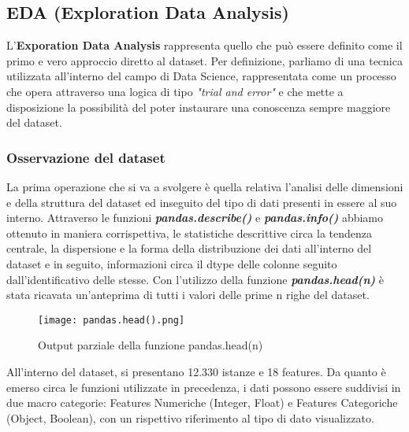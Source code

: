 \documentclass[10pt,a4paper]{article}
\begin{document}
\subsection{EDA (Exploration Data Analysis)}
L'\textbf{Exporation Data Analysis} rappresenta quello che può essere definito come il primo e vero approccio diretto al dataset.
Per definizione, parliamo di una tecnica utilizzata all'interno del campo di Data Science, rappresentata come un processo che opera attraverso una logica di tipo \emph{"trial and error"} e che mette a disposizione la possibilità del poter instaurare una conoscenza sempre maggiore del dataset.

\subsubsection{Osservazione del dataset}
La prima operazione che si va a svolgere è quella relativa l'analisi delle dimensioni e della struttura del dataset ed inseguito del tipo di dati presenti in essere al suo interno.
Attraverso le funzioni  \textbf{\emph{pandas.describe()}} e \textbf{\emph{pandas.info()}} abbiamo ottenuto in maniera corrispettiva, le statistiche descrittive circa la tendenza centrale, la dispersione e la forma della distribuzione dei dati all'interno del dataset e in seguito, informazioni circa il dtype delle colonne seguito dall'identificativo delle stesse.
Con l'utilizzo della funzione \textbf{\emph{pandas.head(n)}} è stata ricavata un'anteprima di tutti i valori delle prime n righe del dataset.

\begin{figure}[ht]
    \centering\texttt{[image: pandas.head().png]}
    \caption{Output parziale della funzione pandas.head(n)}
    \label{fig:example}
\end{figure}

All'interno del dataset, si presentano 12.330 istanze e 18 features. Da quanto è emerso circa le funzioni utilizzate in precedenza, i dati possono essere suddivisi in due macro categorie: Features Numeriche (Integer, Float) e Features Categoriche (Object, Boolean), con un rispettivo riferimento al tipo di dato visualizzato.
\end{document}
